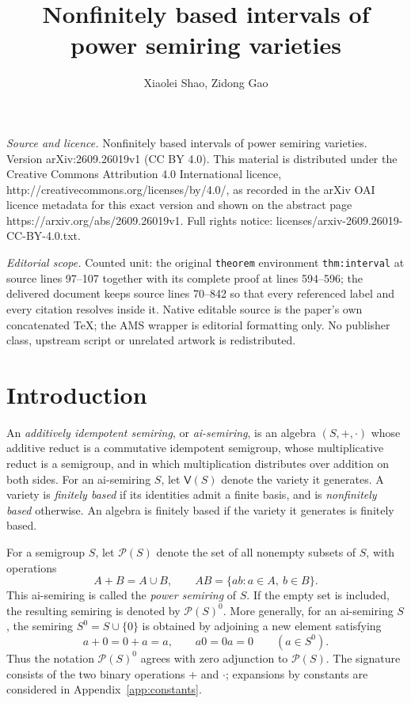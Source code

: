 \documentclass[10pt,a4paper]{amsart}
\numberwithin{equation}{section}
\newcommand{\Pow}{\mathcal{P}}
\newcommand{\Full}[1]{\mathcal{P}(#1)^0}
\newcommand{\Var}{\mathsf{V}}
\begin{document}
\title[Nonfinitely based intervals of power semiring varieties]{Nonfinitely based intervals of power semiring varieties}
\author{Xiaolei Shao, Zidong Gao}
\date{}
\maketitle
\noindent\emph{Source and licence.} Nonfinitely based intervals of power semiring varieties. Version arXiv:2609.26019v1 (CC BY 4.0). This material is distributed under the Creative Commons Attribution 4.0 International licence, http://creativecommons.org/licenses/by/4.0/, as recorded in the arXiv OAI licence metadata for this exact version and shown on the abstract page https://arxiv.org/abs/2609.26019v1. Full rights notice: licenses/arxiv-2609.26019-CC-BY-4.0.txt.\par\smallskip
\noindent\textit{Editorial scope.} Counted unit: the original \texttt{theorem} environment \texttt{thm:interval} at source lines 97--107 together with its complete proof at lines 594--596; the delivered document keeps source lines 70--842 so that every referenced label and every citation resolves inside it. Native editable source is the paper's own concatenated TeX; the AMS wrapper is editorial formatting only. No publisher class, upstream script or unrelated artwork is redistributed.
\section{Introduction}
An \emph{additively idempotent semiring}, or \emph{ai-semiring}, is an algebra $(S,+,\cdot)$ whose additive reduct is a commutative idempotent semigroup, whose multiplicative reduct is a semigroup, and in which multiplication distributes over addition on both sides. For an ai-semiring $S$, let $\Var(S)$ denote the variety it generates. A variety is \emph{finitely based} if its identities admit a finite basis, and is \emph{nonfinitely based} otherwise. An algebra is finitely based if the variety it generates is finitely based.

For a semigroup $S$, let $\Pow(S)$ denote the set of all nonempty subsets of $S$, with operations
\[
 A+B=A\cup B,\qquad AB=\{ab:a\in A,\ b\in B\}.
\]
This ai-semiring is called the \emph{power semiring} of $S$. If the empty set is included, the resulting semiring is denoted by $\Full{S}$. More generally, for an ai-semiring $S$, the semiring $S^0=S\cup\{0\}$ is obtained by adjoining a new element satisfying
\[
 a+0=0+a=a,\qquad a0=0a=0\qquad(a\in S^0).
\]
Thus the notation $\Full{S}$ agrees with zero adjunction to $\Pow(S)$. The signature consists of the two binary operations $+$ and $\cdot$; expansions by constants are considered in Appendix~\ref{app:constants}.
\end{document}
